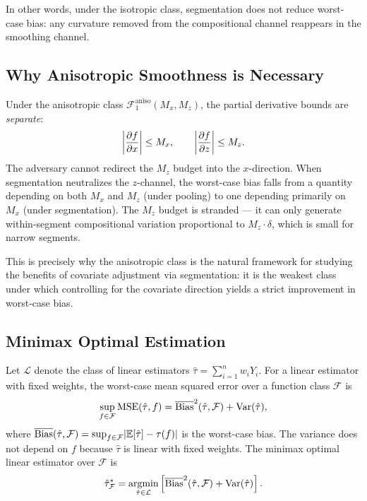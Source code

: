 In other words, under the isotropic class, segmentation does not reduce worst-case bias: any curvature removed from the compositional channel reappears in the smoothing channel.


\subsection*{Why Anisotropic Smoothness is Necessary}

Under the anisotropic class $\mathcal{F}_1^{\mathrm{aniso}}(M_x, M_z)$, the partial derivative bounds are \emph{separate}:
\begin{equation*}
	\abs*{\frac{\partial f}{\partial x}} \leq M_x, \qquad \abs*{\frac{\partial f}{\partial z}} \leq M_z.
\end{equation*}
The adversary cannot redirect the $M_z$ budget into the $x$-direction.
When segmentation neutralizes the $z$-channel, the worst-case bias falls from a quantity depending on both $M_x$ and $M_z$ (under pooling) to one depending primarily on $M_x$ (under segmentation).
The $M_z$ budget is stranded --- it can only generate within-segment compositional variation proportional to $M_z \cdot \delta$, which is small for narrow segments.

This is precisely why the anisotropic class is the natural framework for studying the benefits of covariate adjustment via segmentation: it is the weakest class under which controlling for the covariate direction yields a strict improvement in worst-case bias.


\subsection*{Minimax Optimal Estimation}

\begin{definition}\label{def:minimax}
	Let $\mathcal{L}$ denote the class of linear estimators $\hat\tau = \sum_{i=1}^n w_i Y_i$.
	For a linear estimator with fixed weights, the worst-case mean squared error over a function class $\mathcal{F}$ is
	\begin{equation}\label{eq:minimax_mse}
		\sup_{f \in \mathcal{F}} \mathrm{MSE}(\hat\tau, f) = \wcb^2(\hat\tau, \mathcal{F}) + \Var(\hat\tau),
	\end{equation}
	where $\wcb(\hat\tau, \mathcal{F}) = \sup_{f \in \mathcal{F}} \abs{\E[\hat\tau] - \tau(f)}$ is the worst-case bias.
	The variance does not depend on $f$ because $\hat\tau$ is linear with fixed weights.
	The minimax optimal linear estimator over $\mathcal{F}$ is
	\begin{equation}\label{eq:minimax_estimator}
		\hat\tau^*_{\mathcal{F}} = \argmin_{\hat\tau \in \mathcal{L}} \left[\wcb^2(\hat\tau, \mathcal{F}) + \Var(\hat\tau)\right].
	\end{equation}
\end{definition}


